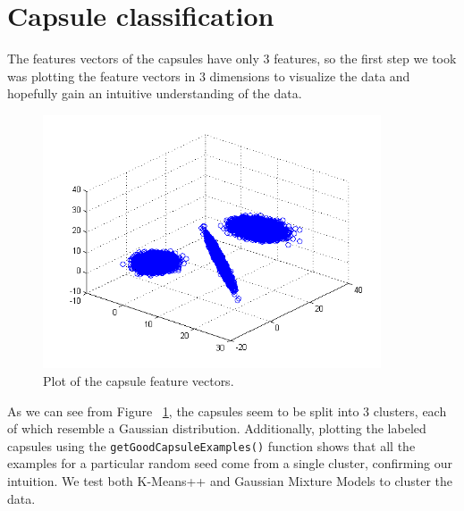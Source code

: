 \documentclass[11pt]{amsart}
\begin{document}
\section{Capsule classification}

The features vectors of the capsules have only 3 features, so the first step we took was plotting the feature vectors in 3 dimensions to visualize the data and hopefully gain an intuitive understanding of the data.

\begin{figure}[h]
	\includegraphics[width=10cm]{capsuleCluster.png}
	\caption{Plot of the capsule feature vectors.}
	\label{fig:capsules}
\end{figure}

As we can see from Figure ~\ref{fig:capsules}, the capsules seem to be split into 3 clusters, each of which resemble a Gaussian distribution. Additionally, plotting the labeled capsules using the \texttt{getGoodCapsuleExamples()} function shows that all the examples for a particular random seed come from a single cluster, confirming our intuition. We test both K-Means++ and Gaussian Mixture Models to cluster the data.
\end{document}
